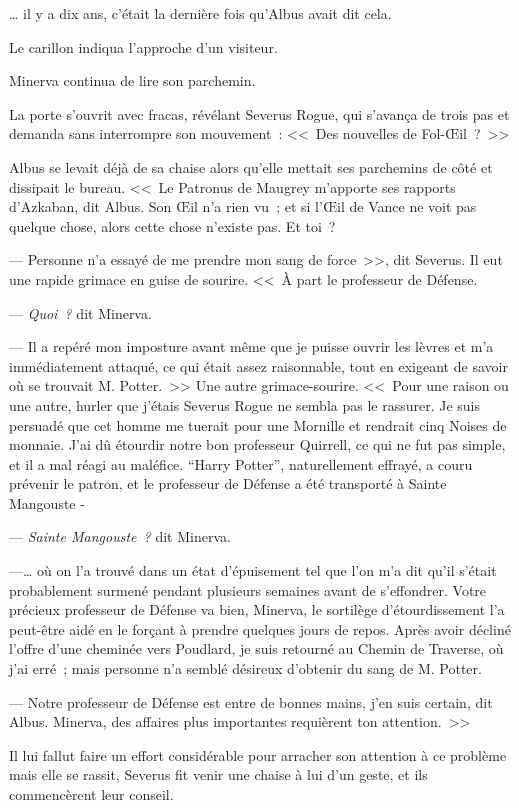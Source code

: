 … il y a dix ans, c'était la dernière fois qu'Albus avait dit cela.

Le carillon indiqua l'approche d'un visiteur.

Minerva continua de lire son parchemin.

La porte s'ouvrit avec fracas, révélant Severus Rogue, qui s'avança de trois pas et demanda sans interrompre son mouvement~: <<~Des nouvelles de Fol-Œil~?~>>

Albus se levait déjà de sa chaise alors qu'elle mettait ses parchemins de côté et dissipait le bureau. <<~Le Patronus de Maugrey m'apporte ses rapports d'Azkaban, dit Albus. Son Œil n'a rien vu~; et si l'Œil de Vance ne voit pas quelque chose, alors cette chose n'existe pas. Et toi~?

--- Personne n'a essayé de me prendre mon sang de force~>>, dit Severus. Il eut une rapide grimace en guise de sourire. <<~À part le professeur de Défense.

--- \emph{Quoi~?} dit Minerva.

--- Il a repéré mon imposture avant même que je puisse ouvrir les lèvres et m'a immédiatement attaqué, ce qui était assez raisonnable, tout en exigeant de savoir où se trouvait M. Potter.~>> Une autre grimace-sourire. <<~Pour une raison ou une autre, hurler que j'étais Severus Rogue ne sembla pas le rassurer. Je suis persuadé que cet homme me tuerait pour une Mornille et rendrait cinq Noises de monnaie. J'ai dû étourdir notre bon professeur Quirrell, ce qui ne fut pas simple, et il a mal réagi au maléfice. “Harry Potter”, naturellement effrayé, a couru prévenir le patron, et le professeur de Défense a été transporté à Sainte Mangouste -

--- \emph{Sainte Mangouste~?} dit Minerva.

---… où on l'a trouvé dans un état d'épuisement tel que l'on m'a dit qu'il s'était probablement surmené pendant plusieurs semaines avant de s'effondrer. Votre précieux professeur de Défense va bien, Minerva, le sortilège d'étourdissement l'a peut-être aidé en le forçant à prendre quelques jours de repos. Après avoir décliné l'offre d'une cheminée vers Poudlard, je suis retourné au Chemin de Traverse, où j'ai erré~; mais personne n'a semblé désireux d'obtenir du sang de M. Potter.

--- Notre professeur de Défense est entre de bonnes mains, j'en suis certain, dit Albus. Minerva, des affaires plus importantes requièrent ton attention.~>>

Il lui fallut faire un effort considérable pour arracher son attention à ce problème mais elle se rassit, Severus fit venir une chaise à lui d'un geste, et ils commencèrent leur conseil.

